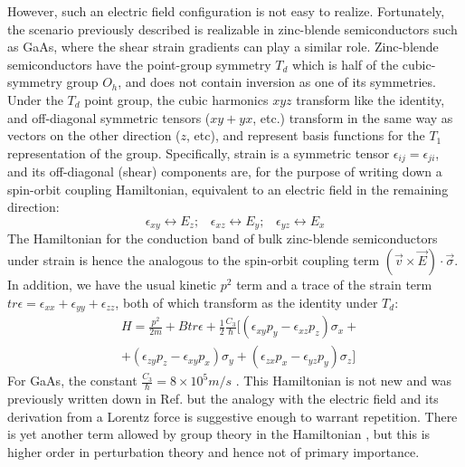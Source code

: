 \documentclass[prl,aps,amssymb,shownopacs,twocolumn]{revtex4}
\begin{document}
	However, such an electric field configuration is not easy to
	realize. Fortunately, the scenario previously described is
	realizable in zinc-blende semiconductors such as GaAs, where the
	shear strain gradients can play a similar role. Zinc-blende
	semiconductors have the point-group symmetry $T_d$ which is half
	of the cubic-symmetry group $O_h$, and does not contain inversion
	as one of its symmetries. Under the $T_d$ point group, the cubic
	harmonics $xyz$ transform like the identity, and off-diagonal
	symmetric tensors ($xy +yx$, etc.) transform in the same way as
	vectors on the other direction ($z$, etc), and represent basis
	functions for the $T_1$ representation of the group. Specifically,
	strain is a symmetric tensor $\epsilon_{ij} = \epsilon_{ji}$, and
	its off-diagonal (shear) components are, for the purpose of
	writing down a spin-orbit coupling Hamiltonian, equivalent to an
	electric field in the remaining direction:
	\begin{equation} \label{strainelectricfieldanalogy}
		\epsilon_{xy} \leftrightarrow E_z;\;\;\; \epsilon_{xz} \leftrightarrow
		E_y;\;\;\;\epsilon_{yz} \leftrightarrow E_x
	\end{equation}
	\noindent The Hamiltonian for the conduction band of bulk
	zinc-blende semiconductors under strain is hence the analogous to
	the spin-orbit coupling term $(\vec{v} \times \vec{E})\cdot
	\vec{\sigma}$. In addition, we have the usual kinetic $p^2$ term
	and a trace of the strain term $tr{\epsilon} = \epsilon_{xx} +
	\epsilon_{yy} +\epsilon_{zz}$, both of which transform as the
	identity under $T_d$:
	\begin{eqnarray}
		& H = \frac{p^2}{2m} + B tr{\epsilon} +\frac{1}{2}
		\frac{C_3}{\hbar}
		[ (\epsilon_{xy} p_y - \epsilon_{xz} p_z) \sigma_x + \nonumber \\
		& +(\epsilon_{zy} p_z - \epsilon_{xy} p_x) \sigma_y + (\epsilon_{zx}
		p_x - \epsilon_{yz} p_y) \sigma_z ]
	\end{eqnarray}
	\noindent For GaAs, the constant $\frac{C_3}{\hbar} = 8 \times
	10^5 m/s$ \cite{dyakonov1986}. This Hamiltonian is not new and was
	previously written down in Ref.
	\cite{pikus1984,howlett1977,khaetskii2001,bahder1990} but the
	analogy with the electric field and its derivation from a Lorentz
	force is suggestive enough to warrant repetition. There is yet
	another term allowed by group theory in the Hamiltonian
	\cite{bernevig2004}, but this is higher order in perturbation
	theory and hence not of primary importance.
	
\end{document}
